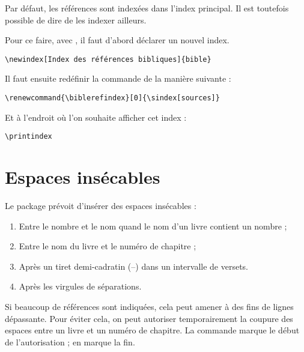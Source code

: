 Par défaut, les références sont indexées dans l'index principal. Il est toutefois possible de dire de les indexer ailleurs.

Pour ce faire, avec , il faut d'abord déclarer un nouvel index.

\begin{verbatim}
\newindex[Index des références bibliques]{bible}
\end{verbatim}

Il faut ensuite redéfinir la commande \commande{\biblerefindex} de la manière suivante :
\begin{verbatim}
\renewcommand{\biblerefindex}[0]{\sindex[sources]}
\end{verbatim}

Et à l'endroit où l'on souhaite afficher cet index :
\begin{verbatim}
\printindex
\end{verbatim}

\section{Espaces insécables}

Le package  prévoit d'insérer des espaces insécables :
\begin{enumerate}
\item Entre le nombre et le nom quand le nom d’un livre contient un nombre ;
\item Entre le nom du livre et le numéro de chapitre ;
\item Après un tiret demi-cadratin (–) dans un intervalle de versets.
\item Après les virgules de séparations.
\end{enumerate}

Si beaucoup de références sont indiquées, cela peut amener à des fins de lignes dépassante.
Pour éviter cela, on peut autoriser temporairement la coupure des espaces entre un livre et un numéro de chapitre. La commande  marque le début de l'autorisation ;  en marque la fin.

